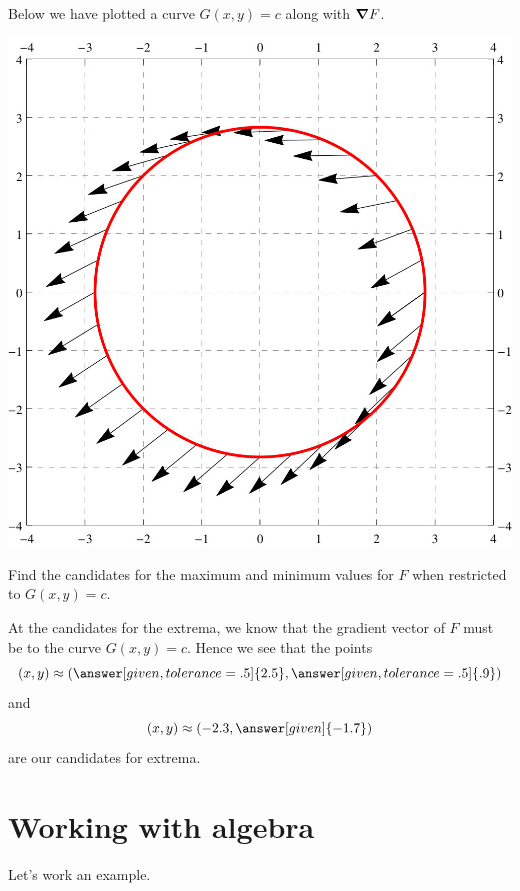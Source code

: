 \documentclass{ximera}
\begin{document}
\begin{example}
  Below we have plotted a curve $G(x,y) = c$ along with $\boldsymbol\nabla F$.
  \begin{image}
    \includegraphics{curveVectors2.jpg}
  \end{image}
  Find the candidates for the maximum and minimum values for $F$ when
  restricted to $G(x,y) = c$.
  \begin{explanation}
    At the candidates for the extrema, we know that the gradient
    vector of $F$ must be
     to
    the curve $G(x,y) = c$. Hence we see that the points
    \[
    (x,y)\approx(\answer[given,tolerance=.5]{2.5},\answer[given,tolerance=.5]{.9})
    \]
    and
    \[
    (x,y)\approx (-2.3,\answer[given]{-1.7})
    \]
    are our candidates for extrema.
  \end{explanation}
\end{example}


\section{Working with algebra}

Let's work an example.
\end{document}
